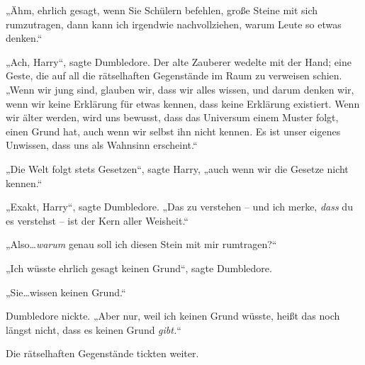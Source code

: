 „Ähm, ehrlich gesagt, wenn Sie Schülern befehlen, große Steine mit sich rumzutragen, dann kann ich irgendwie nachvollziehen, warum Leute so etwas denken.“

„Ach, Harry“, sagte Dumbledore. Der alte Zauberer wedelte mit der Hand; eine Geste, die auf all die rätselhaften Gegenstände im Raum zu verweisen schien. „Wenn wir jung sind, glauben wir, dass wir alles wissen, und darum denken wir, wenn wir keine Erklärung für etwas kennen, dass keine Erklärung existiert. Wenn wir älter werden, wird uns bewusst, dass das Universum einem Muster folgt, einen Grund hat, auch wenn wir selbst ihn nicht kennen. Es ist unser eigenes Unwissen, dass uns als Wahnsinn erscheint.“

„Die Welt folgt stets Gesetzen“, sagte Harry, „auch wenn wir die Gesetze nicht kennen.“

„Exakt, Harry“, sagte Dumbledore. „Das zu verstehen – und ich merke, \emph{dass} du es verstehst – ist der Kern aller Weisheit.“

„Also…\emph{warum} genau soll ich diesen Stein mit mir rumtragen?“

„Ich wüsste ehrlich gesagt keinen Grund“, sagte Dumbledore.

„Sie…wissen keinen Grund.“

Dumbledore nickte. „Aber nur, weil ich keinen Grund wüsste, heißt das noch längst nicht, dass es keinen Grund \emph{gibt.}“

Die rätselhaften Gegenstände tickten weiter.

